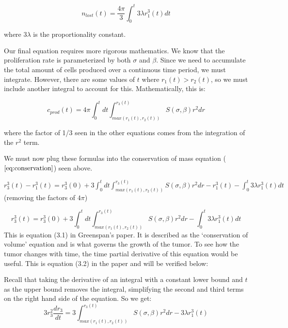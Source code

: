 \documentclass{article}
\begin{document}
\begin{equation}
    n_{lost}(t) = \frac{4\pi}{3} \int_{0}^{t}3\lambda r_1^3(t) dt
\end{equation}

where $3\lambda$ is the proportionality constant.

Our final equation requires more rigorous mathematics. We know that the proliferation rate is parameterized
by both $\sigma$ and $\beta$. Since we need to accumulate the total amount of cells produced over a continuous
time period, we must integrate. However, there are some values of $t$ where $r_1(t) > r_2(t)$, so we must include
another integral to account for this. Mathematically, this is:

\begin{equation}
    c_{prod}(t) = 4\pi \int_{0}^{t} dt \int_{max(r_1(t), r_2(t))}^{r_3(t)} S(\sigma, \beta) r^2 dr
\end{equation}

where the factor of 1/3 seen in the other equations comes from the integration of the $r^2$ term.

We must now plug these formulas into the conservation of mass equation ($\ref{eq:conservation}$) seen above.

$ r_3^3(t) - r_1^3(t) = r_3^3(0) + 3\int_{0}^{t} dt \int_{max(r_1(t), r_2(t))}^{r_3(t)} S(\sigma, \beta) r^2 dr -
    r_1^3(t) - \int_{0}^{t}3\lambda r_1^3(t) dt $ (removing the factors of $4\pi$)

\begin{equation}
    r_3^3(t) = r_3^3(0) + 3\int_{0}^{t} dt \int_{max(r_1(t), r_2(t))}^{r_3(t)} S(\sigma, \beta) r^2 dr
    - \int_{0}^{t}3\lambda r_1^3(t) dt
\end{equation}
This is equation (3.1) in Greenspan's paper. It is described as the `conservation of volume' equation and is what
governs the growth of the tumor. To see how the tumor changes with time, the time partial derivative of this equation
would be useful. This is equation (3.2) in the paper and will be verified below:

Recall that taking the derivative of an integral with a constant lower bound and $t$ as the upper bound removes the integral,
simplifying the second and third terms on the right hand side of the equation. So we get:
\begin{equation}
    3r_3^2\frac{dr_3}{dt} = 3\int_{max(r_1(t), r_2(t))}^{r_3(t)} S(\sigma, \beta) r^2 dr - 3\lambda r_1^3(t)
\end{equation}
\end{document}
